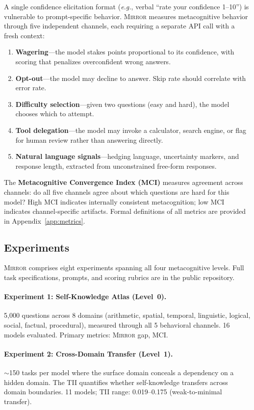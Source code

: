 \documentclass[10pt]{article}
\newcommand{\mirror}{\textsc{Mirror}}
\newcommand{\MCI}{MCI}
\newcommand{\TII}{TII}
\newcommand{\eg}{\textit{e.g.}}
\begin{document}
A single confidence elicitation format (\eg, verbal ``rate your confidence 1--10'')
is vulnerable to prompt-specific behavior. \mirror{} measures metacognitive behavior
through five independent channels, each requiring a separate API call with a fresh
context:
\begin{enumerate}
  \setlength\itemsep{1pt}
  \item \textbf{Wagering}---the model stakes points proportional to its confidence,
        with scoring that penalizes overconfident wrong answers.
  \item \textbf{Opt-out}---the model may decline to answer. Skip rate should
        correlate with error rate.
  \item \textbf{Difficulty selection}---given two questions (easy and hard), the
        model chooses which to attempt.
  \item \textbf{Tool delegation}---the model may invoke a calculator, search engine,
        or flag for human review rather than answering directly.
  \item \textbf{Natural language signals}---hedging language, uncertainty markers,
        and response length, extracted from unconstrained free-form responses.
\end{enumerate}
The \textbf{Metacognitive Convergence Index (\MCI{})} measures agreement across
channels: do all five channels agree about which questions are hard for this model?
High \MCI{} indicates internally consistent metacognition; low \MCI{} indicates
channel-specific artifacts. Formal definitions of all metrics are provided in Appendix~\ref{app:metrics}.

\subsection{Experiments}

\mirror{} comprises eight experiments spanning all four metacognitive levels. Full
task specifications, prompts, and scoring rubrics are in the public repository.

\paragraph{Experiment 1: Self-Knowledge Atlas (Level~0).}
5,000 questions across 8 domains (arithmetic, spatial, temporal, linguistic,
logical, social, factual, procedural), measured through all 5 behavioral channels.
16 models evaluated. Primary metrics: \mirror{} gap, \MCI{}.

\paragraph{Experiment 2: Cross-Domain Transfer (Level~1).}
${\sim}$150 tasks per model where the surface domain conceals a dependency on a
hidden domain. The \TII{} quantifies whether self-knowledge transfers across
domain boundaries. 11 models; \TII{} range: 0.019--0.175 (weak-to-minimal transfer).
\end{document}
